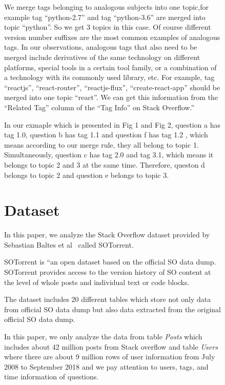 \documentclass[conference]{IEEEtran}
\begin{document}
\begin{figure}[t]
We merge tags belonging to analogous subjects into one topic,for example tag ``python-2.7'' and tag ``python-3.6'' are merged into topic ``python''. So we get 3 topics in this case. 
Of course different version number suffixes are the most common examples of analogous tags. In our observations, analogous tags that also need to be merged include derivatives of the same technology on different platforms, special tools in a certain tool family, or a combination of a technology with its commonly used library, etc. For example, tag ``reactjs'', ``react-router'', ``reactjs-flux'', ``create-react-app'' should be merged into one topic ``react''.
We can get this information from the ``Related Tag'' column of the ``Tag Info'' on Stack Overflow.''

In our exmaple which is presented in Fig 1 and Fig 2,  question a has tag 1.0, question b has tag 1.1 and question f has tag 1.2 , which means according to our merge rule, they all belong to topic 1.  Simultaneously, question c has tag 2.0 and tag 3.1, which means it belongs to topic 2 and 3 at the same time. Therefore, queston d belongs to topic 2 and question e belongs to topic 3.

\section{Dataset}
In this paper, we analyze the Stack Overflow dataset provided by Sebastian Baltes et al~\cite{msr2019challenge} called SOTorrent. 

SOTorrent is “an open dataset based on the official SO data dump. SOTorrent provides access to the version history of SO content at the level of whole posts and individual text or code blocks.

The dataset includes 20 different tables which store not only data from official SO data dump but also data extracted from the original official SO data dump.

In this paper, we only analyze the data from table \emph{Posts} which includes about 42 million posts from Stack overflow and table \emph{Users} where there are about 9 million rows of user information from July 2008 to September 2018 and we pay attention to users, tags, and time information of questions.


\end{figure}
\end{document}
